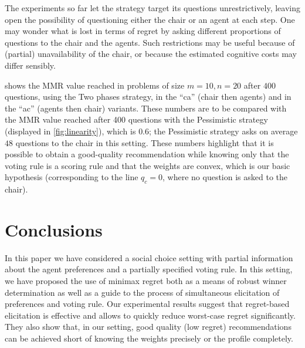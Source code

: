 \documentclass{article}
\begin{document}
The experiments so far let the strategy target its questions unrestrictively, leaving open the possibility of questioning either the chair or an agent at each step. One may wonder what is lost in terms of regret by asking different proportions of questions to the chair and the agents. Such restrictions may be useful because of (partial) unavailability of the chair, or because the estimated cognitive costs may differ sensibly. %

 shows the MMR value reached in problems of size $m = 10, n = 20$ after $400$ questions, using the Two phases strategy, in the “ca” (chair then agents) and in the “ac” (agents then chair) variants. These numbers are to be compared with the MMR value reached after 400 questions with the Pessimistic strategy (displayed in \cref{fig:linearity}), which is $0.6$; the Pessimistic strategy asks on average $48$ questions to the chair in this setting.
These numbers highlight that it is possible to obtain a good-quality recommendation while knowing only that the voting rule is a scoring rule and that the weights are convex, which is our basic hypothesis (corresponding to the line $q_c = 0$, where no question is asked to the chair).

\section{Conclusions}  
\label{sec:conclusions}
In this paper we have considered a social choice setting with partial information about the agent preferences and a partially specified voting rule.
In this setting, we have proposed the use of minimax regret both as a means of robust winner determination as well as a guide to the process of simultaneous elicitation of preferences and voting rule.
Our experimental results %
suggest that regret-based elicitation is effective and allows to quickly reduce worst-case regret significantly. They also show that, in our setting, good quality (low regret) recommendations can be achieved short of knowing the weights precisely or the profile completely.
\end{document}

